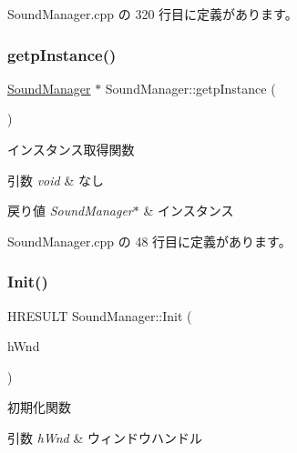  Sound\+Manager.\+cpp の 320 行目に定義があります。

\mbox{\label{class_sound_manager_ae46d05e32c52587ff3988f5ef81c1cbe}} 
\subsubsection{\texorpdfstring{getp\+Instance()}{getpInstance()}}
{\footnotesize\ttfamily \mbox{\hyperlink{class_sound_manager}{Sound\+Manager}} $\ast$ Sound\+Manager\+::getp\+Instance (\begin{DoxyParamCaption}{ }\end{DoxyParamCaption})\hspace{0.3cm}{\ttfamily [static]}}



インスタンス取得関数 


\begin{DoxyParams}{引数}
{\em void} & なし \\
\hline
\end{DoxyParams}

\begin{DoxyRetVals}{戻り値}
{\em Sound\+Manager$\ast$} & インスタンス \\
\hline
\end{DoxyRetVals}


 Sound\+Manager.\+cpp の 48 行目に定義があります。

\mbox{\label{class_sound_manager_ab6f67ebd0f3a3555b334870c46c6d52b}} 
\subsubsection{\texorpdfstring{Init()}{Init()}}
{\footnotesize\ttfamily H\+R\+E\+S\+U\+LT Sound\+Manager\+::\+Init (\begin{DoxyParamCaption}\item[{H\+W\+ND}]{h\+Wnd }\end{DoxyParamCaption})}



初期化関数 


\begin{DoxyParams}{引数}
{\em h\+Wnd} & ウィンドウハンドル \\
\hline
\end{DoxyParams}

